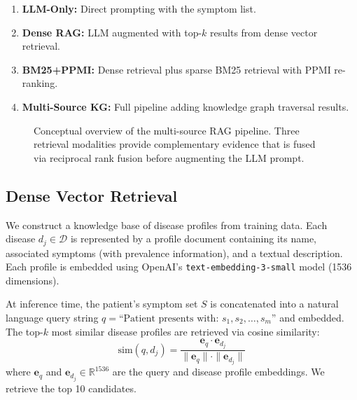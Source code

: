 \documentclass[review]{elsarticle}
\begin{document}
\begin{enumerate}
    \item \textbf{LLM-Only:} Direct prompting with the symptom list.
    \item \textbf{Dense RAG:} LLM augmented with top-$k$ results from dense vector retrieval.
    \item \textbf{BM25+PPMI:} Dense retrieval plus sparse BM25 retrieval with PPMI re-ranking.
    \item \textbf{Multi-Source KG:} Full pipeline adding knowledge graph traversal results.
\end{enumerate}

\begin{figure}[t]
\centering
{}
\caption{Conceptual overview of the multi-source RAG pipeline. Three retrieval modalities provide complementary evidence that is fused via reciprocal rank fusion before augmenting the LLM prompt.}
\label{fig:architecture}
\end{figure}

\subsection{Dense Vector Retrieval}
\label{sec:dense}

We construct a knowledge base of disease profiles from training data. Each disease $d_j \in \mathcal{D}$ is represented by a profile document containing its name, associated symptoms (with prevalence information), and a textual description. Each profile is embedded using OpenAI's \texttt{text-embedding-3-small} model (1536 dimensions).

At inference time, the patient's symptom set $S$ is concatenated into a natural language query string $q = \text{``Patient presents with: } s_1, s_2, \ldots, s_m\text{''}$ and embedded. The top-$k$ most similar disease profiles are retrieved via cosine similarity:
\begin{equation}
    \text{sim}(q, d_j) = \frac{\mathbf{e}_q \cdot \mathbf{e}_{d_j}}{\|\mathbf{e}_q\| \cdot \|\mathbf{e}_{d_j}\|}
\end{equation}
where $\mathbf{e}_q$ and $\mathbf{e}_{d_j} \in \mathbb{R}^{1536}$ are the query and disease profile embeddings. We retrieve the top 10 candidates.
\end{document}
